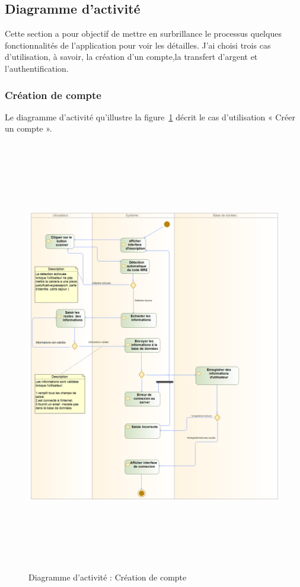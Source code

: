 \subsection{Diagramme d’activité}
Cette section a pour objectif de mettre en surbrillance le processus quelques fonctionnalités de
l’application pour voir les détailles. J’ai choisi trois cas d’utilisation, à savoir, la création d’un compte,la transfert d'argent et l'authentification.
\newpage
\subsubsection{Création de compte}
Le diagramme d’activité qu’illustre la figure~\ref{activiteCompte} décrit le cas d’utilisation « Créer un compte ».
\begin{figure}[h!]
	\includegraphics[width=18cm, height=19cm]{./Template LaTeX/Images/ins_act.png}
\caption{Diagramme d’activité : Création de compte}
\label{activiteCompte}

\end{figure}

